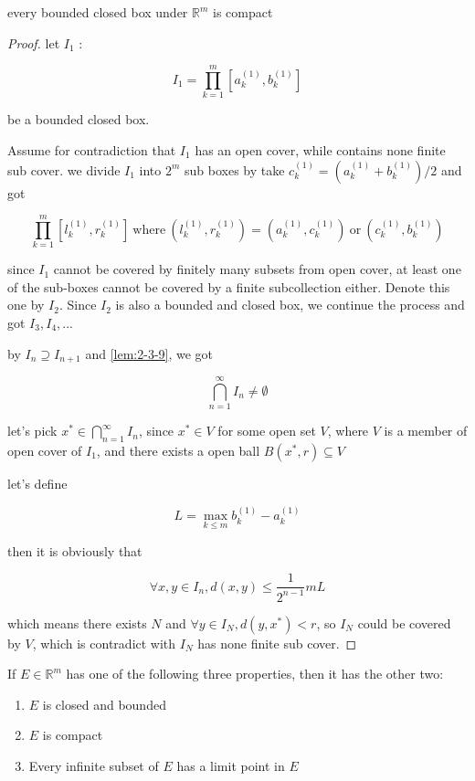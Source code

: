 \begin{thm}
    \label{thm:2-3-10}
    every bounded closed box under $\mathbb{R}^m$ is compact
\end{thm}

\begin{proof}
    let $I_1$ :

    \[
        I_1 = \prod_{k=1}^{m} [a_k^{(1)},b_k^{(1)}] 
    \]

    be a bounded closed box.

    Assume for contradiction that $I_1$ has an open cover, while contains none finite sub cover.
    we divide $I_1$ into $2^m$ sub boxes by take $c_k^{(1)} = (a_k^{(1)} + b_k^{(1)}) / 2$ and got

    \[
        \prod_{k=1}^{m} [l_k^{(1)},r_k^{(1)}] \: \mathrm{where}\: (l_k^{(1)},r_k^{(1)}) = (a_k^{(1)},c_k^{(1)}) \:\mathrm{or} \: (c_k^{(1)},b_k^{(1)})
    \]

    since $I_1$ cannot be covered by finitely many subsets from open cover, at least one of the sub-boxes cannot be covered by a finite subcollection either.
    Denote this one by $I_2$. Since $I_2$ is also a bounded and closed box, we continue the process and got
    $I_3,I_4,...$

    by $I_n \supseteq I_{n+1}$ and \autoref{lem:2-3-9}, we got

    \[
        \bigcap_{n=1}^{\infty}I_n \ne \emptyset
    \]

    let's pick $x^* \in \bigcap_{n=1}^{\infty}I_n$, since $x^* \in V$ for some open set $V$, where $V$ is a member of open cover of $I_1$, and there 
    exists a open ball $B(x^*,r) \subseteq V$

    let's define 

    \[
        L = \max_{k \le m} b_k^{(1)} - a_k^{(1)}
    \]

    then it is obviously that

    \[
    \forall x,y \in I_n, d(x,y) \le \frac{1}{2^{n-1}}mL
    \]

    which means there exists $N$ and $\forall y \in I_N, d(y, x^*) < r$, so $I_N$ could be covered by $V$, which is contradict with $I_N$
    has none finite sub cover. 

\end{proof}

\begin{thm}
    If $E \in \mathbb{R}^m$ has one of the following three properties, then it has the other two:

    \begin{enumerate}
        \item $E$ is closed and bounded

        \item $E$ is compact

        \item Every infinite subset of $E$ has a limit point in $E$
    \end{enumerate}

\end{thm}


